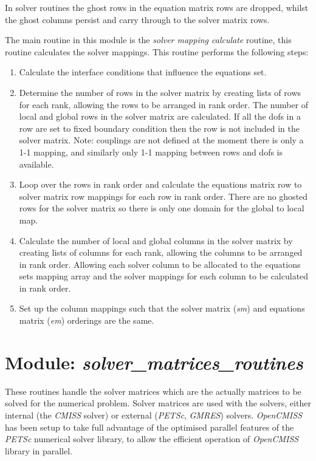 In solver routines the ghost rows in the equation matrix rows are dropped, 
whilst the ghost columns persist and carry through to the solver matrix rows.

The main routine in this module is the \emph{solver mapping calculate} routine,
this routine calculates the solver mappings. This routine performs the 
following steps:

\begin{enumerate}
 \item Calculate the interface conditions that influence the equations set.
 \item Determine the number of rows in the solver matrix by creating lists of 
rows for each rank, allowing the rows to be arranged in rank order. The number 
of local and global rows in the solver matrix are calculated. If all the dofs 
in a row are set to fixed boundary condition then the row is not included in 
the solver matrix. Note: couplings are not defined at the moment there is only 
a 1-1 mapping, and similarly only 1-1 mapping between rows and dofs is 
available. 
 \item Loop over the rows in rank order and calculate the equations matrix row
to solver matrix row mappings for each row in rank order. There are no ghosted 
rows for the solver matrix so there is only one domain for the global to local 
map. 
 \item Calculate the number of local and global columns in the solver matrix by 
creating lists of columns for each rank, allowing the columns to be arranged in 
rank order. Allowing each solver column to be allocated to the equations sets 
mapping array and the solver mappings for each column to be calculated in rank 
order.
 \item Set up the column mappings such that the solver matrix (\emph{sm}) and 
equations matrix (\emph{em}) orderings are the same.
\end{enumerate}


\section{Module: \emph{solver\_matrices\_routines}}
\label{sec:solvermatricesroutines}

These routines handle the solver matrices which are the actually matrices to 
be solved for the numerical problem. Solver matrices are used with the solvers, 
either internal (the \emph{CMISS} solver) or external (\emph{PETSc}, 
\emph{GMRES}) solvers. \emph{OpenCMISS} has been setup to take full advantage of 
the optimised parallel features of the \emph{PETSc} numerical solver library, to  
allow the efficient operation of \emph{OpenCMISS} library in parallel.


